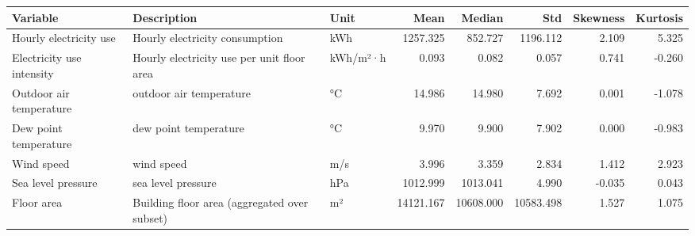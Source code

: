 \begin{tabular}{lllrrrrr}
\toprule
Variable & Description & Unit & Mean & Median & Std & Skewness & Kurtosis \\
\midrule
Hourly electricity use & Hourly electricity consumption & kWh & 1257.325 & 852.727 & 1196.112 & 2.109 & 5.325 \\
Electricity use intensity & Hourly electricity use per unit floor area & kWh/m²·h & 0.093 & 0.082 & 0.057 & 0.741 & -0.260 \\
Outdoor air temperature & outdoor air temperature & °C & 14.986 & 14.980 & 7.692 & 0.001 & -1.078 \\
Dew point temperature & dew point temperature & °C & 9.970 & 9.900 & 7.902 & 0.000 & -0.983 \\
Wind speed & wind speed & m/s & 3.996 & 3.359 & 2.834 & 1.412 & 2.923 \\
Sea level pressure & sea level pressure & hPa & 1012.999 & 1013.041 & 4.990 & -0.035 & 0.043 \\
Floor area & Building floor area (aggregated over subset) & m² & 14121.167 & 10608.000 & 10583.498 & 1.527 & 1.075 \\
\bottomrule
\end{tabular}
